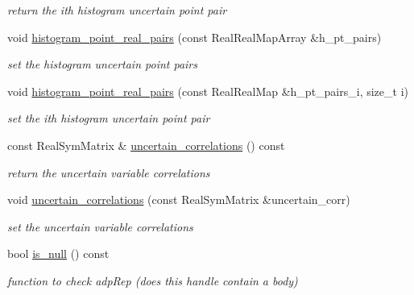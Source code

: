 \begin{DoxyCompactItemize}
\begin{DoxyCompactList}\small\item\em return the ith histogram uncertain point pair \end{DoxyCompactList}\item 
void \hyperlink{classPecos_1_1AleatoryDistParams_aac2b155e7bf1e6c76cb83f017d4f95d4}{histogram\+\_\+point\+\_\+real\+\_\+pairs} (const Real\+Real\+Map\+Array \&h\+\_\+pt\+\_\+pairs)\label{classPecos_1_1AleatoryDistParams_aac2b155e7bf1e6c76cb83f017d4f95d4}

\begin{DoxyCompactList}\small\item\em set the histogram uncertain point pairs \end{DoxyCompactList}\item 
void \hyperlink{classPecos_1_1AleatoryDistParams_abae3e593c7504477f9a8bc3f22e2ed73}{histogram\+\_\+point\+\_\+real\+\_\+pairs} (const Real\+Real\+Map \&h\+\_\+pt\+\_\+pairs\+\_\+i, size\+\_\+t i)\label{classPecos_1_1AleatoryDistParams_abae3e593c7504477f9a8bc3f22e2ed73}

\begin{DoxyCompactList}\small\item\em set the ith histogram uncertain point pair \end{DoxyCompactList}\item 
const Real\+Sym\+Matrix \& \hyperlink{classPecos_1_1AleatoryDistParams_a0be0cd8abe3fcc1412474bed14810e54}{uncertain\+\_\+correlations} () const \label{classPecos_1_1AleatoryDistParams_a0be0cd8abe3fcc1412474bed14810e54}

\begin{DoxyCompactList}\small\item\em return the uncertain variable correlations \end{DoxyCompactList}\item 
void \hyperlink{classPecos_1_1AleatoryDistParams_a38ae622ec97f60800a081262370432a4}{uncertain\+\_\+correlations} (const Real\+Sym\+Matrix \&uncertain\+\_\+corr)\label{classPecos_1_1AleatoryDistParams_a38ae622ec97f60800a081262370432a4}

\begin{DoxyCompactList}\small\item\em set the uncertain variable correlations \end{DoxyCompactList}\item 
bool \hyperlink{classPecos_1_1AleatoryDistParams_a3c45461717ff230edd665ce24da988c5}{is\+\_\+null} () const \label{classPecos_1_1AleatoryDistParams_a3c45461717ff230edd665ce24da988c5}

\begin{DoxyCompactList}\small\item\em function to check adp\+Rep (does this handle contain a body) \end{DoxyCompactList}\end{DoxyCompactItemize}
